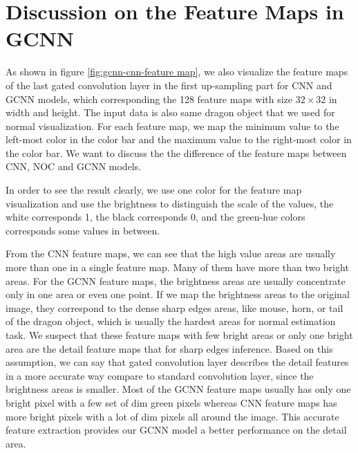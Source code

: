 \section{Discussion on the Feature Maps in GCNN}

As shown in figure \ref{fig:gcnn-cnn-feature map}, we also visualize the feature maps of the last gated convolution layer in the first up-sampling part for CNN and GCNN models, which corresponding the 128 feature maps with size $ 32\times 32 $ in width and height. The input data is also same dragon object that we used for normal visualization. For each feature map, we map the minimum value to the left-most color in the color bar and the maximum value to the right-most color in the color bar. 
We want to discuss the the difference of the feature maps between CNN, NOC and GCNN models.

In order to see the result clearly, we use one color for the feature map visualization and use the brightness to distinguish the scale of the values, the white corresponds 1, the black corresponds 0, and the green-hue colors corresponds some values in between. 

From the CNN feature maps, we can see that the high value areas are usually more than one in a single feature map. Many of them have more than two bright areas. 
 For the GCNN feature maps, the brightness areas are usually concentrate only in one area or even one point. If we map the brightness areas to the original image, they correspond to the dense sharp edges areas, like mouse, horn, or tail of the dragon object, which is usually the hardest areas for normal estimation task. We suspect that these feature maps with few bright areas or only one bright area are the detail feature maps that for sharp edges inference. Based on this assumption, we can say that gated convolution layer describes the detail features in a more accurate way compare to standard convolution layer, since the brightness areas is smaller. Most of the GCNN feature maps usually has only one bright pixel with a few set of dim green pixels whereas CNN feature maps has more bright pixels with a lot of dim pixels all around the image. This accurate feature extraction provides our GCNN model a better performance on the detail area.

